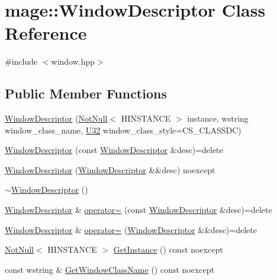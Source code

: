 \hypertarget{classmage_1_1_window_descriptor}{}\section{mage\+:\+:Window\+Descriptor Class Reference}
\label{classmage_1_1_window_descriptor}


{\ttfamily \#include $<$window.\+hpp$>$}

\subsection*{Public Member Functions}
\begin{DoxyCompactItemize}
\item 
\mbox{\hyperlink{classmage_1_1_window_descriptor_af7a5263d567d320a2edd1420293d55e7}{Window\+Descriptor}} (\mbox{\hyperlink{namespacemage_a8769f9d670d6b585ea306cb1062af94b}{Not\+Null}}$<$ H\+I\+N\+S\+T\+A\+N\+CE $>$ instance, wstring window\+\_\+class\+\_\+name, \mbox{\hyperlink{namespacemage_a41c104c036fba3756a74e19f793eeaa1}{U32}} window\+\_\+class\+\_\+style=C\+S\+\_\+\+C\+L\+A\+S\+S\+DC)
\item 
\mbox{\hyperlink{classmage_1_1_window_descriptor_a98059ff14fd8c0e808d1a15dbf9b6bb8}{Window\+Descriptor}} (const \mbox{\hyperlink{classmage_1_1_window_descriptor}{Window\+Descriptor}} \&desc)=delete
\item 
\mbox{\hyperlink{classmage_1_1_window_descriptor_a9c63bbf4c794efd0e6dbc067d3378ccd}{Window\+Descriptor}} (\mbox{\hyperlink{classmage_1_1_window_descriptor}{Window\+Descriptor}} \&\&desc) noexcept
\item 
\mbox{\hyperlink{classmage_1_1_window_descriptor_ac73160dd1e90b9acf819164b774d5709}{$\sim$\+Window\+Descriptor}} ()
\item 
\mbox{\hyperlink{classmage_1_1_window_descriptor}{Window\+Descriptor}} \& \mbox{\hyperlink{classmage_1_1_window_descriptor_a539433423c905e8b45d5bc9d895ee79c}{operator=}} (const \mbox{\hyperlink{classmage_1_1_window_descriptor}{Window\+Descriptor}} \&desc)=delete
\item 
\mbox{\hyperlink{classmage_1_1_window_descriptor}{Window\+Descriptor}} \& \mbox{\hyperlink{classmage_1_1_window_descriptor_a314e45a7cac3a68caefd8b05ddc86040}{operator=}} (\mbox{\hyperlink{classmage_1_1_window_descriptor}{Window\+Descriptor}} \&\&desc)=delete
\item 
\mbox{\hyperlink{namespacemage_a8769f9d670d6b585ea306cb1062af94b}{Not\+Null}}$<$ H\+I\+N\+S\+T\+A\+N\+CE $>$ \mbox{\hyperlink{classmage_1_1_window_descriptor_a09423845e3cc6bd451e280a92222ca14}{Get\+Instance}} () const noexcept
\item 
const wstring \& \mbox{\hyperlink{classmage_1_1_window_descriptor_a28e28c6aca97423689066d0f642e3561}{Get\+Window\+Class\+Name}} () const noexcept
\end{DoxyCompactItemize}
